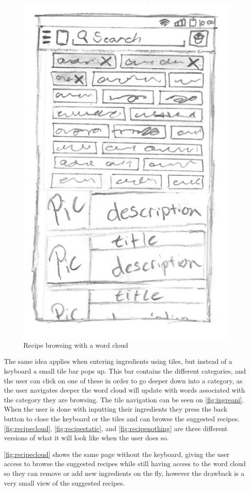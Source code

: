\begin{figure}[H]
\begin{minipage}[b]{0.5\columnwidth}
\includegraphics[width=0.72\columnwidth]{img/prototypes/recipe_browse.pdf}
\caption{Recipe browsing with a word cloud\label{fig:recipecloud}}
\end{minipage}
\end{figure}

The same idea applies when entering ingredients using tiles, but instead of a keyboard a small tile bar pops up. This bar contains the different categories, and the user can click on one of these in order to go deeper down into a category, as the user navigates deeper the word cloud will update with words associated with the category they are browsing. The tile navigation can be seen on \autoref{fig:ingreani}. When the user is done with inputting their ingredients they press the back button to close the keyboard or the tiles and can browse the suggested recipes. \autoref{fig:recipecloud}, \autoref{fig:recipestatic}, and \autoref{fig:recipenothing} are three different versions of what it will look like when the user does so.

\autoref{fig:recipecloud} shows the same page without the keyboard, giving the user access to browse the suggested recipes while still having access to the word cloud so they can remove or add new ingredients on the fly, however the drawback is a very small view of the suggested recipes. 

